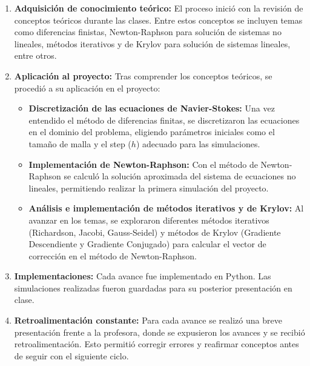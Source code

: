 \documentclass{article}
\begin{document}
  \begin{enumerate}
      \item \textbf{Adquisición de conocimiento teórico:} 
      El proceso inició con la revisión de conceptos teóricos durante las clases. Entre estos conceptos se incluyen temas como diferencias finistas, Newton-Raphson para solución de sistemas no lineales, métodos iterativos y de Krylov para solución de sistemas lineales, entre otros.
      
      \item \textbf{Aplicación al proyecto:}  
      Tras comprender los conceptos teóricos, se procedió a su aplicación en el proyecto:
      
      \begin{itemize}
          \item \textbf{Discretización de las ecuaciones de Navier-Stokes:}  
          Una vez entendido el método de diferencias finitas, se discretizaron las ecuaciones en el dominio del problema, eligiendo parámetros iniciales como el tamaño de malla y el step ($h$) adecuado para las simulaciones.  

          \item \textbf{Implementación de Newton-Raphson:}  
          Con el método de Newton-Raphson se calculó la solución aproximada del sistema de ecuaciones no lineales, permitiendo realizar la primera simulación del proyecto.  

          \item \textbf{Análisis e implementación de métodos iterativos y de Krylov:}  
          Al avanzar en los temas, se exploraron diferentes métodos iterativos (Richardson, Jacobi, Gauss-Seidel) y métodos de Krylov (Gradiente Descendiente y Gradiente Conjugado) para calcular el vector de corrección en el método de Newton-Raphson.
      \end{itemize}
      
      \item \textbf{Implementaciones:}  
      Cada avance fue implementado en Python. Las simulaciones realizadas fueron guardadas para su posterior presentación en clase.
      
      \item \textbf{Retroalimentación constante:}  
      Para cada avance se realizó una breve presentación frente a la profesora, donde se expusieron los avances y se recibió retroalimentación. Esto permitió corregir errores y reafirmar conceptos antes de seguir con el siguiente ciclo. 
  \end{enumerate}
\end{document}
